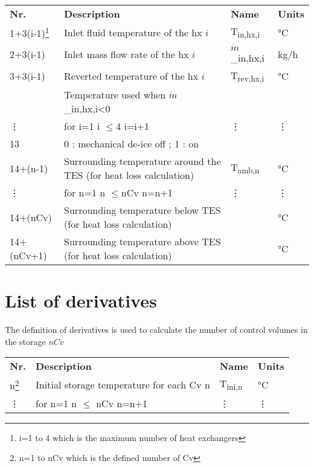 \documentclass[english]{SPFReport}
\begin{document}
\begin{tabular}{| l |  m{8cm} | l | l |}
\hline
\hline
\textbf{Nr.} & \textbf{Description}& \textbf{Name} & \textbf{Units} \\
\small{1+3(i-1)\footnote{i=1 to 4 which is the maximum number of heat exchangers}}  & Inlet fluid temperature of the hx $i$&  \si{T_{in,hx,i}} & \si{\degreeCelsius}  \\
\small{2+3(i-1)}  & Inlet mass flow rate of the hx $i$&  \si{$\dot m$_{in,hx,i}} & \si{kg/h} \\
\small{3+3(i-1)}  & Reverted temperature of the hx $i$ &  \si{T_{rev,hx,i}}  & \si{\degreeCelsius} \\
& Temperature used when \si{$\dot m$_{in,hx,i}<0} &  &\\
\vdots  &for i=1 i $\leq$4 i=i+1   & \vdots & \vdots\\
13  & 0 : mechanical de-ice off ; 1 : on  &  &   \\
14+(n-1)  & Surrounding temperature around the TES (for heat loss calculation) & \si{T_{amb,n}} & \si{\degreeCelsius} \\
\vdots   &  for n=1 n $\leq$nCv n=n+1 & \vdots & \vdots \\
14+(nCv)  & Surrounding temperature below TES (for heat loss calculation) &  & \si{\degreeCelsius} \\
14+(nCv+1)  & Surrounding temperature above TES (for heat loss calculation) &  & \si{\degreeCelsius} \\
\hline
\hline
\end{tabular}


\section{List of derivatives}

The definition of derivatives is used to calculate the number of control volumes in the storage $nCv$

\begin{tabular}{| l |  m{8cm} | l | l |}
\hline
\hline
\textbf{Nr.} & \textbf{Description}& \textbf{Name} & \textbf{Units} \\
\small{n\footnote{n=1 to nCv which is the defined number of Cv}}  & Initial storage temperature for each Cv n&  \si{T_{ini,n}} & \si{\degreeCelsius} \\
\vdots  &for n=1 n $\leq$ nCv n=n+1   & \vdots & \vdots \\
\hline
\end{tabular}
\end{document}
